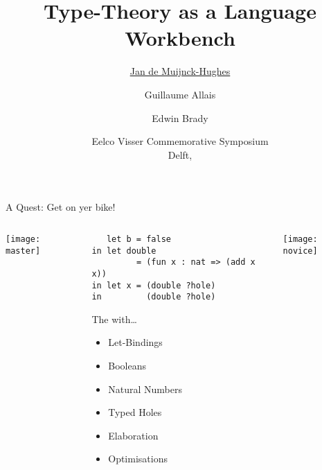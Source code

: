 \documentclass[pdftex,british,final,infofoot, biblio,aspectratio=169]{slidedeck}
\title{Type-Theory as a Language Workbench}
\author[Jan de Muijnck-Hughes \and Guillaume Allais \and Edwin Brady]{\underline{Jan de Muijnck-Hughes} \and Guillaume Allais \and Edwin Brady}
\date[EVCS '23]
{%
  Eelco Visser Commemorative Symposium \\ Delft, \origdate\printdate{2023-04-05}%
}
\begin{document}
\maketitle

\begin{frame}[fragile]{A Quest: Get on yer bike!}
  \begin{columns}
    \begin{column}{0.2\textwidth}
      \centering
      \texttt{[image: master]}
      \\
      \Huge{}
    \end{column}
    \begin{column}{0.5\textwidth}
      \begin{center}
        {\huge{}}
      \end{center}
\begin{Verbatim}
   let b = false
in let double
         = (fun x : nat => (add x x))
in let x = (double ?hole)
in         (double ?hole)
\end{Verbatim}

        \begin{block}{}
          The  with\ldots
          \vspace{-1em}
          \begin{multicols}{2}
            \begin{itemize}
            \item Let-Bindings
            \item Booleans
            \item Natural Numbers
            \item Typed Holes
            \item Elaboration
            \item Optimisations
            \end{itemize}
          \end{multicols}
        \end{block}

    \end{column}
    \begin{column}{0.2\textwidth}
      \centering
      \texttt{[image: novice]}
      \\
      \Huge{}
    \end{column}
  \end{columns}

\end{frame}
\end{document}
